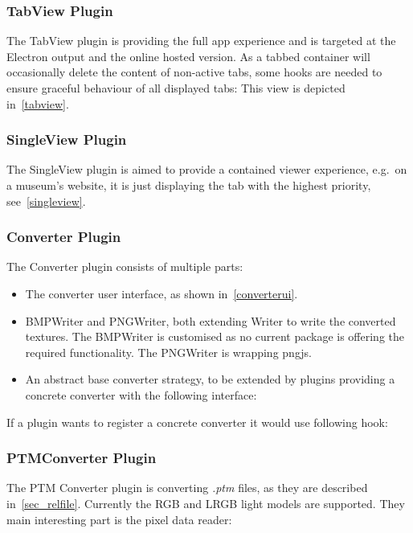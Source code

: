 \subsubsection{TabView Plugin}
The TabView plugin is providing the full app experience and is targeted at the
Electron output and the online hosted version. As a tabbed container will
occasionally delete the content of non-active tabs, some hooks are needed to
ensure graceful behaviour of all displayed tabs:
This view is depicted in~\autoref{tabview}.

\subsubsection{SingleView Plugin}
The SingleView plugin is aimed to provide a contained viewer experience, e.g.\ on
a museum's website, it is just displaying the tab with the highest priority, see~\autoref{singleview}.

\subsubsection{Converter Plugin}
The Converter plugin consists of multiple parts:
\begin{itemize}
\item The converter user interface, as shown in~\autoref{converterui}.
\item BMPWriter and PNGWriter, both extending Writer to write the converted
  textures. The BMPWriter is customised as no current package is offering the
  required functionality. The PNGWriter is wrapping pngjs.
\item An abstract base converter strategy, to be extended by plugins providing a
  concrete converter with the following interface:
\end{itemize}
If a plugin wants to register a concrete converter it would use following hook:

\subsubsection{PTMConverter Plugin}\label{sec_ptmconverter}
The PTM Converter plugin is converting \emph{.ptm} files, as they are described
in~\autoref{sec_relfile}. Currently the RGB and LRGB light models are
supported. They main interesting part is the pixel data reader:


